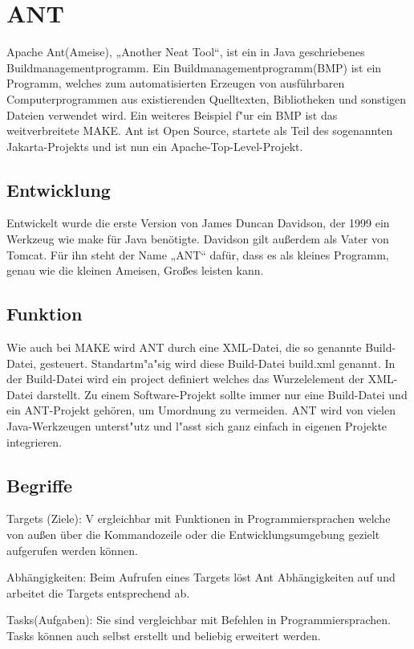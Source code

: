 \section{ANT}
Apache Ant(Ameise), „Another Neat Tool“, ist ein in Java geschriebenes Buildmanagementprogramm. Ein Buildmanagementprogramm(BMP) ist ein Programm, welches zum automatisierten Erzeugen von ausführbaren Computerprogrammen aus existierenden Quelltexten, Bibliotheken und sonstigen Dateien verwendet wird. Ein weiteres Beispiel f"ur ein BMP ist das weitverbreitete MAKE. Ant ist Open Source, startete als Teil des sogenannten Jakarta-Projekts und ist nun ein Apache-Top-Level-Projekt. 

\subsection{Entwicklung}
Entwickelt wurde die erste Version von James Duncan Davidson, der 1999 ein Werkzeug wie make für Java benötigte. Davidson gilt außerdem als Vater von Tomcat. Für ihn steht der Name „ANT“ dafür, dass es als kleines Programm, genau wie die kleinen Ameisen, Großes leisten kann.

\subsection{Funktion}
Wie auch bei MAKE wird ANT durch eine XML-Datei, die so genannte Build-Datei, gesteuert. Standartm"a"sig wird diese Build-Datei build.xml genannt. In der Build-Datei wird ein project definiert welches das Wurzelelement der XML-Datei darstellt. Zu einem Software-Projekt sollte immer nur eine Build-Datei und ein ANT-Projekt gehören, um Umordnung zu vermeiden. ANT wird von vielen Java-Werkzeugen unterst"utz und l"asst sich ganz einfach in eigenen Projekte integrieren.

\subsection{Begriffe}
Targets (Ziele): V ergleichbar mit Funktionen in Programmiersprachen welche von außen über die Kommandozeile oder die Entwicklungsumgebung gezielt aufgerufen werden können.

Abhängigkeiten: Beim Aufrufen eines Targets löst Ant Abhängigkeiten auf und arbeitet die Targets entsprechend ab.

Tasks(Aufgaben): Sie sind vergleichbar mit Befehlen in Programmiersprachen. Tasks können auch selbst erstellt und beliebig erweitert werden.

